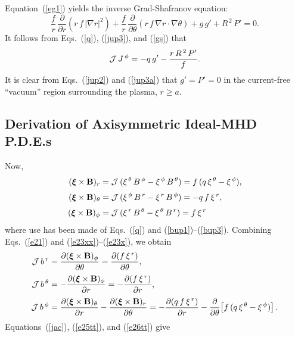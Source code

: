 \documentclass[12pt,prb,aps]{revtex4-1}
\newcommand {\bxi}{\mbox{\boldmath$\xi$}}
\begin{document}
Equation~(\ref{eg1}) yields the inverse Grad-Shafranov equation:\cite{connor}
\begin{equation}\label{gs}
\frac{f}{r}\,\frac{\partial}{\partial r}\!\left(r\,f\,|\nabla r|^2\right) +\frac{f}{r}\,\frac{\partial}{\partial\theta}\!\left(r\,f\,\nabla r\cdot\nabla\theta\right)+g\,g' + R^{\,2}\,P'=0.
\end{equation}
It follows from Eqs.~(\ref{q}), (\ref{jup3}), and (\ref{gs}) that
\begin{equation}\label{jup3a}
{\cal J}\,J^{\,\phi} = -q\,g' - \frac{r\,R^{\,2}\,P'}{f}.
\end{equation}
It is clear from Eqs.~(\ref{jup2}) and (\ref{jup3a}) that $g'=P'=0$ in the  current-free ``vacuum'' region surrounding the plasma, $r\geq a$. 

\subsection{Derivation of Axisymmetric Ideal-MHD P.D.E.s}\label{deriv}
Now,\cite{tj}
\begin{align}
(\bxi\times {\bf B})_r&= {\cal J}\,(\xi^{\,\theta}\,B^{\,\phi} - \xi^{\,\phi}\,B^{\,\theta}) = f\,(q\,\xi^{\,\theta}-\xi^{\,\phi}),\label{e23xx}\\[0.5ex]
(\bxi\times {\bf B})_\theta&= {\cal J}\,(\xi^{\,\phi}\,B^{\,r} - \xi^{\,r}\,B^{\,\phi}) = -q\,f\,\xi^{\,r},\\[0.5ex]
(\bxi\times {\bf B})_\phi &= {\cal J}\,(\xi^{\,r}\,B^{\,\theta} - \xi^{\,\theta}\,B^{\,r})= f\,\xi^{\,r}\label{e23x}
\end{align}
where use has been made of  Eqs.~(\ref{q}) and (\ref{bup1})--(\ref{bup3}).
 Combining Eqs.~(\ref{e21}) and (\ref{e23xx})--(\ref{e23x}), we obtain\,\cite{tj}
\begin{align}
{\cal J}\,b^{\,r} &= \frac{\partial (\bxi\times {\bf B})_\phi }{\partial\theta}= \frac{\partial (f\,\xi^{\,r})}{\partial\theta},\label{e25tt}\\[0.5ex]
{\cal J}\,b^{\,\theta} &=-\frac{\partial (\bxi\times {\bf B})_\phi }{\partial r}= -\frac{\partial (f\,\xi^{\,r})}{\partial r},\label{e26tt}\\[0.5ex]
{\cal J}\,b^{\,\phi}&=\frac{\partial (\bxi\times {\bf B})_\theta}{\partial r}-\frac{\partial (\bxi\times {\bf B})_r }{\partial \theta}=
 -\frac{\partial (q\,f\,\xi^{\,r})}{\partial r} - \frac{\partial}{\partial\theta}\!\left[f\,(q\,\xi^{\,\theta}-\xi^{\,\phi})\right].\label{e27tt}
\end{align}
Equations~(\ref{jac}), (\ref{e25tt}), and (\ref{e26tt}) give\,\cite{tj}
\end{document}
